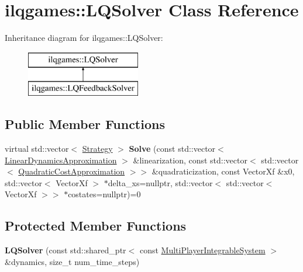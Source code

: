 \hypertarget{classilqgames_1_1_l_q_solver}{}\section{ilqgames\+:\+:L\+Q\+Solver Class Reference}
\label{classilqgames_1_1_l_q_solver}
Inheritance diagram for ilqgames\+:\+:L\+Q\+Solver\+:\begin{figure}[H]
\begin{center}
\leavevmode
\includegraphics[height=1.996435cm]{classilqgames_1_1_l_q_solver}
\end{center}
\end{figure}
\subsection*{Public Member Functions}
\begin{DoxyCompactItemize}
\item 
virtual std\+::vector$<$ \hyperlink{structilqgames_1_1_strategy}{Strategy} $>$ {\bfseries Solve} (const std\+::vector$<$ \hyperlink{structilqgames_1_1_linear_dynamics_approximation}{Linear\+Dynamics\+Approximation} $>$ \&linearization, const std\+::vector$<$ std\+::vector$<$ \hyperlink{structilqgames_1_1_quadratic_cost_approximation}{Quadratic\+Cost\+Approximation} $>$$>$ \&quadraticization, const Vector\+Xf \&x0, std\+::vector$<$ Vector\+Xf $>$ $\ast$delta\+\_\+xs=nullptr, std\+::vector$<$ std\+::vector$<$ Vector\+Xf $>$$>$ $\ast$costates=nullptr)=0\hypertarget{classilqgames_1_1_l_q_solver_ae690ab374b32236c3bb09e2b4d2b57d2}{}\label{classilqgames_1_1_l_q_solver_ae690ab374b32236c3bb09e2b4d2b57d2}

\end{DoxyCompactItemize}
\subsection*{Protected Member Functions}
\begin{DoxyCompactItemize}
\item 
{\bfseries L\+Q\+Solver} (const std\+::shared\+\_\+ptr$<$ const \hyperlink{classilqgames_1_1_multi_player_integrable_system}{Multi\+Player\+Integrable\+System} $>$ \&dynamics, size\+\_\+t num\+\_\+time\+\_\+steps)\hypertarget{classilqgames_1_1_l_q_solver_a0f96c7942e604bb26c68a48b2cb9dbc8}{}\label{classilqgames_1_1_l_q_solver_a0f96c7942e604bb26c68a48b2cb9dbc8}

\end{DoxyCompactItemize}

